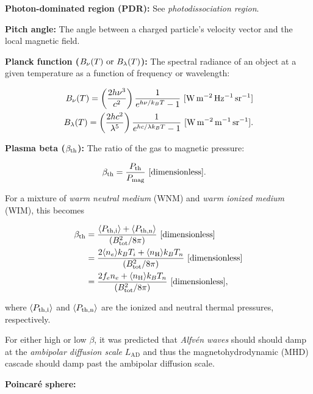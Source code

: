 \documentclass[a4paper,10pt]{article}
\begin{document}
{\noindent}\textbf{Photon-dominated region (PDR):} See \textit{photodissociation region}.

{\noindent}\textbf{Pitch angle:} The angle between a charged particle's velocity vector and the local magnetic field.

{\noindent}\textbf{Planck function ($B_\nu(T)~{\rm or}~B_\lambda(T)$):} The spectral radiance of an object at a given temperature as a function of frequency or wavelength:

\begin{align*}
    B_\nu(T) = \left(\frac{2h\nu^3}{c^2}\right) \frac{1}{e^{h\nu/k_BT}-1} ~ [{\rm W\,m^{-2}\,Hz^{-1}\,sr^{-1}}] \\
    B_\lambda(T) = \left(\frac{2hc^2}{\lambda^5}\right) \frac{1}{e^{hc/\lambda k_BT}-1} ~ [{\rm W\,m^{-2}\,m^{-1}\,sr^{-1}}].
\end{align*}

{\noindent}\textbf{Plasma beta ($\beta_{\rm th}$):} The ratio of the gas to magnetic pressure:

\begin{align*}
    \beta_{\rm th} &= \frac{P_{\rm th}}{P_{\rm mag}} ~ [{\rm dimensionless}].
\end{align*}

{\noindent}For a mixture of \textit{warm neutral medium} (WNM) and \textit{warm ionized medium} (WIM), this becomes

\begin{align*}
\beta_{\rm th} &= \frac{ \langle P_{\rm th,i}\rangle + \langle P_{\rm th,n}\rangle }{(B_{\rm tot}^2/8\pi)} ~ [{\rm dimensionless}] \\
                      &= \frac{2\langle n_e\rangle k_BT_i + \langle n_{\rm H}\rangle k_BT_n}{(B_{\rm tot}^2/8\pi)}  ~ [{\rm dimensionless}] \\
                      &= \frac{2f_en_e+ \langle n_{\rm H}\rangle k_BT_n}{(B_{\rm tot}^2/8\pi)}  ~ [{\rm dimensionless}],
\end{align*}

{\noindent}where $\langle P_{\rm th,i}\rangle$ and $\langle P_{\rm th,n}\rangle$ are the ionized and neutral thermal pressures, respectively.

{\noindent}For either high or low $\beta$, it was predicted that \textit{Alfv\'en waves} should should damp at the \textit{ambipolar diffusion scale} $L_\mathrm{AD}$ and thus the magnetohydrodynamic (MHD) cascade should damp past the ambipolar diffusion scale.

{\noindent}\textbf{Poincar\'e sphere:}
\end{document}
